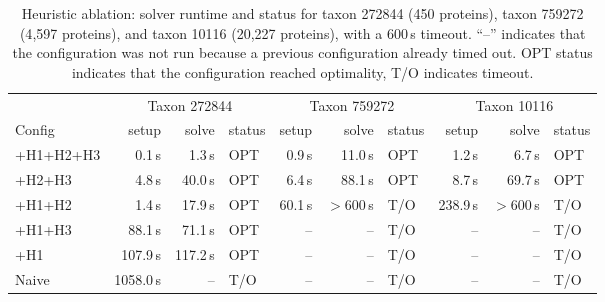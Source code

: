 \begin{table}[!h]
\centering
\caption{Heuristic ablation: solver runtime and status for taxon 272844 (450 proteins), taxon 759272 (4{,}597 proteins), and taxon 10116 (20{,}227 proteins), with a 600\,s timeout. ``--'' indicates that the configuration was not run because a previous configuration already timed out. OPT status indicates that the configuration reached optimality, T/O indicates timeout.}
\label{tab:ablation-solve}
\small
\setlength{\tabcolsep}{3pt}
\begin{tabular}{lrrl@{\hspace{8pt}}rrl@{\hspace{8pt}}rrl}
\toprule
 & \multicolumn{3}{c}{Taxon 272844} & \multicolumn{3}{c}{Taxon 759272} & \multicolumn{3}{c}{Taxon 10116} \\
\cmidrule(lr){2-4}\cmidrule(lr){5-7}\cmidrule(lr){8-10}
Config & setup & solve & status & setup & solve & status & setup & solve & status \\
\midrule
+H1+H2+H3 & 0.1\,s & 1.3\,s & OPT & 0.9\,s & 11.0\,s & OPT & 1.2\,s & 6.7\,s & OPT \\
+H2+H3    & 4.8\,s & 40.0\,s & OPT & 6.4\,s & 88.1\,s & OPT & 8.7\,s & 69.7\,s & OPT \\
+H1+H2    & 1.4\,s & 17.9\,s & OPT & 60.1\,s & $>$600\,s & T/O & 238.9\,s & $>$600\,s & T/O \\
+H1+H3    & 88.1\,s & 71.1\,s & OPT & -- & -- & T/O & -- & -- & T/O \\
+H1       & 107.9\,s & 117.2\,s & OPT & -- & -- & T/O & -- & -- & T/O \\
Naive     & 1058.0\,s & -- & T/O & -- & -- & T/O & -- & -- & T/O \\
\bottomrule
\end{tabular}
\end{table}
